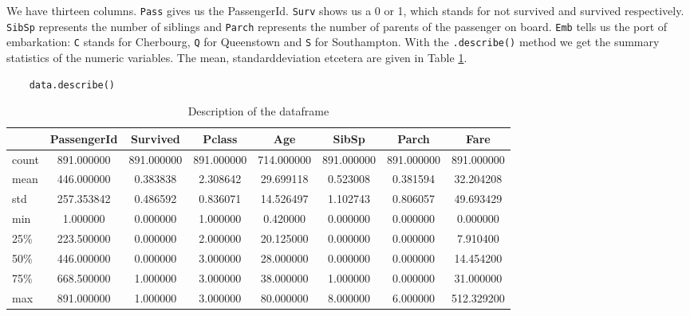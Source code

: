 \documentclass[11pt]{article}
\begin{document}
We have thirteen columns. \texttt{Pass} gives us the PassengerId. \texttt{Surv} shows us a 0 or 1, which stands for not survived and survived respectively. \texttt{SibSp} represents the number of siblings and \texttt{Parch} represents the number of parents of the passenger on board. \texttt{Emb} tells us the port of embarkation: \texttt{C} stands for Cherbourg, \texttt{Q} for Queenstown and \texttt{S} for Southampton. With the \texttt{.describe()} method we get the summary statistics of the numeric variables. The mean, standarddeviation etcetera are given in Table \ref{tab:table2}.

\begin{verbatim}
    data.describe()
\end{verbatim}

\begin{table}
\small
\begin{center}
\caption{\label{tab:table2}Description of the dataframe}
\begin{tabular}{|l|c|c|c|c|c|c|c|}
\toprule
\hline
{} &  PassengerId &    Survived &      Pclass &         Age &       SibSp &       Parch &        Fare \\
\midrule
\hline
count &   891.000000 &  891.000000 &  891.000000 &  714.000000 &  891.000000 &  891.000000 &  891.000000 \\
mean  &   446.000000 &    0.383838 &    2.308642 &   29.699118 &    0.523008 &    0.381594 &   32.204208 \\
std   &   257.353842 &    0.486592 &    0.836071 &   14.526497 &    1.102743 &    0.806057 &   49.693429 \\
min   &     1.000000 &    0.000000 &    1.000000 &    0.420000 &    0.000000 &    0.000000 &    0.000000 \\
25\%   &   223.500000 &    0.000000 &    2.000000 &   20.125000 &    0.000000 &    0.000000 &    7.910400 \\
50\%   &   446.000000 &    0.000000 &    3.000000 &   28.000000 &    0.000000 &    0.000000 &   14.454200 \\
75\%   &   668.500000 &    1.000000 &    3.000000 &   38.000000 &    1.000000 &    0.000000 &   31.000000 \\
max   &   891.000000 &    1.000000 &    3.000000 &   80.000000 &    8.000000 &    6.000000 &  512.329200 \\
\bottomrule
\hline
\end{tabular}
\end{center}
\end{table}
\end{document}
